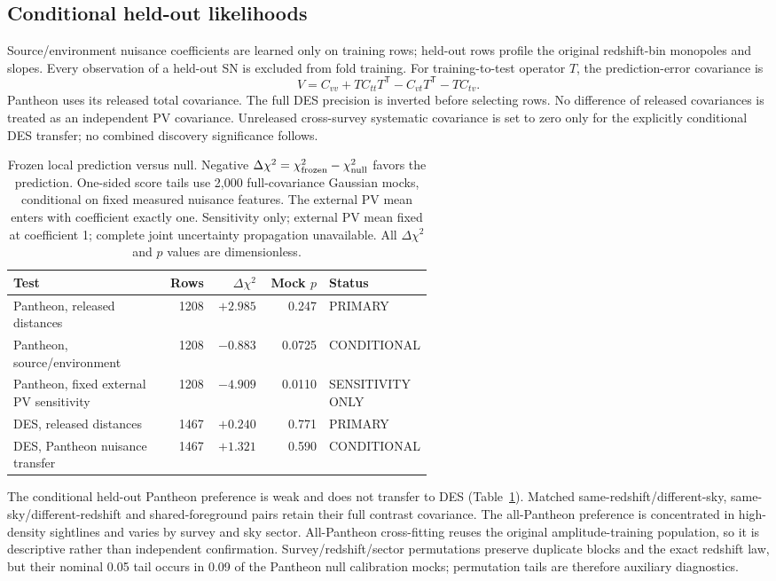 \subsection{Conditional held-out likelihoods}
Source/environment nuisance coefficients are learned only on training rows;
held-out rows profile the original redshift-bin monopoles and slopes.
Every observation of a held-out SN is excluded from fold training.
For training-to-test operator $T$, the prediction-error covariance is
\begin{equation}
 V=C_{vv}+T C_{tt}T^{\mathsf T}
       -C_{vt}T^{\mathsf T}-T C_{tv}.
\end{equation}
Pantheon uses its released total covariance. The full DES precision is
inverted before selecting rows. No difference of released covariances is
treated as an independent PV covariance. Unreleased cross-survey systematic
covariance is set to zero only for the explicitly conditional DES transfer;
no combined discovery significance follows.

\begin{table}[ht]
\centering\small
\begin{tabular}{@{}p{0.37\linewidth}rrrp{0.18\linewidth}@{}}
\toprule
Test & Rows & $\Delta\chi^2$ & Mock $p$ & Status\\
\midrule
Pantheon, released distances & 1208 & $+2.985$ & 0.247 & PRIMARY\\
Pantheon, source/environment & 1208 & $-0.883$ & 0.0725 & CONDITIONAL\\
Pantheon, fixed external PV sensitivity & 1208 & $-4.909$ & 0.0110 & SENSITIVITY ONLY\\
DES, released distances & 1467 & $+0.240$ & 0.771 & PRIMARY\\
DES, Pantheon nuisance transfer & 1467 & $+1.321$ & 0.590 & CONDITIONAL\\
\bottomrule
\end{tabular}
\caption{Frozen local prediction versus null. Negative
$\Delta\chi^2=\chi^2_{\rm frozen}-\chi^2_{\rm null}$ favors the prediction.
One-sided score tails use 2,000 full-covariance Gaussian mocks,
conditional on fixed measured nuisance features. The external PV mean
enters with coefficient exactly one. Sensitivity only; external PV mean
fixed at coefficient 1; complete joint uncertainty propagation unavailable.
All $\Delta\chi^2$ and $p$ values are dimensionless.}
\label{tab:sn-sightline-tests}
\end{table}

The conditional held-out Pantheon preference is weak and does not transfer to
DES (Table~\ref{tab:sn-sightline-tests}). Matched same-redshift/different-sky,
same-sky/different-redshift and shared-foreground pairs retain their full
contrast covariance. The all-Pantheon preference is concentrated in
high-density sightlines and varies by survey and sky sector. All-Pantheon
cross-fitting reuses the original amplitude-training population, so it is
descriptive rather than independent confirmation. Survey/redshift/sector
permutations preserve duplicate blocks and the exact redshift law, but
their nominal 0.05 tail occurs in 0.09 of the Pantheon null calibration
mocks; permutation tails are therefore auxiliary diagnostics.

